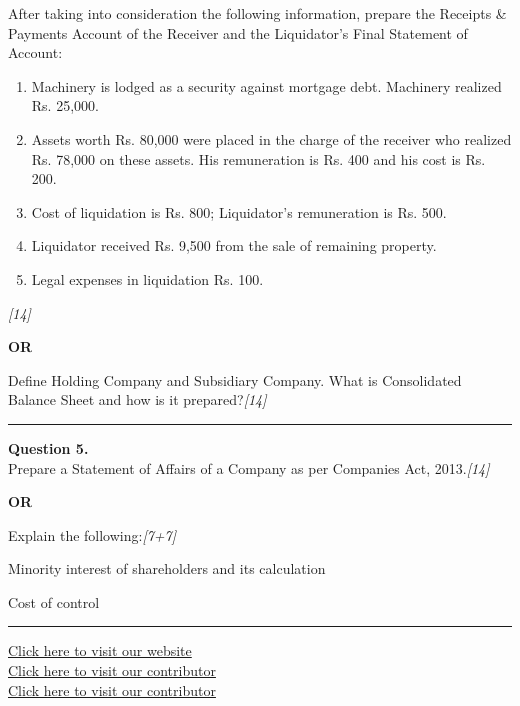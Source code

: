 \documentclass[11pt,a4paper]{article}
\newcommand{\pts}[1]{\hfill   \textit{[#1]}}
\begin{document}
After taking into consideration the following information, prepare the Receipts \& Payments Account of the Receiver and the Liquidator's Final Statement of Account:

\begin{enumerate}
  \item Machinery is lodged as a security against mortgage debt. Machinery realized Rs. 25,000.
  \item Assets worth Rs. 80,000 were placed in the charge of the receiver who realized Rs. 78,000 on these assets. His remuneration is Rs. 400 and his cost is Rs. 200.
  \item Cost of liquidation is Rs. 800; Liquidator's remuneration is Rs. 500.
  \item Liquidator received Rs. 9,500 from the sale of remaining property.
  \item Legal expenses in liquidation Rs. 100.
\end{enumerate}\pts{14}

\centerline{   \textbf{OR}}

Define Holding Company and Subsidiary Company. What is Consolidated Balance Sheet and how is it prepared?\pts{14}

\medskip\rule{\linewidth}{0.2pt}




\noindent   \textbf{Question 5.} \\
Prepare a Statement of Affairs of a Company as per Companies Act, 2013.\pts{14}

\centerline{   \textbf{OR}}

Explain the following:\pts{7+7}

\begin{parts}
  \item Minority interest of shareholders and its calculation
  \item Cost of control
\end{parts}

\vfill
\rule{\linewidth}{0.4pt}

\begin{center}\small
  \href{https://bhu-exam.vercel.app/}{Click here to visit our website}\\[4pt]
  \href{https://me-aryan.vercel.app/}{Click here to visit our contributor}\\[4pt]
  \href{https://quashan-me.vercel.app/}{Click here to visit our contributor}
\end{center}
\end{document}
